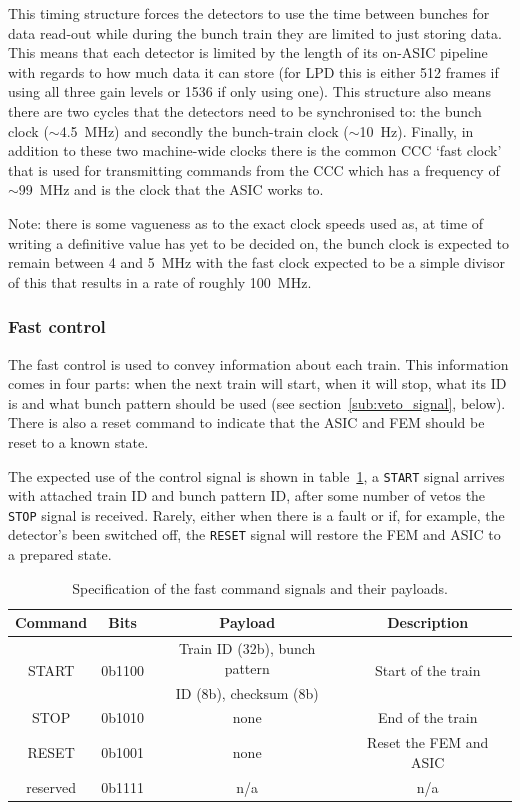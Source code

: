This timing structure forces the detectors to use the time between bunches for data read-out while during the bunch train they are limited to just storing data. This means that each detector is limited by the length of its on-ASIC pipeline with regards to how much data it can store (for LPD this is either 512 frames if using all three gain levels or 1536 if only using one). This structure also means there are two cycles that the detectors need to be synchronised to: the bunch clock (\(\sim\)4.5~MHz) and secondly the bunch-train clock (\(\sim\)10~Hz). Finally, in addition to these two machine-wide clocks there is the common CCC `fast clock' that is used for transmitting commands from the CCC which has a frequency of \(\sim\)99~MHz and is the clock that the ASIC works to.

Note: there is some vagueness as to the exact clock speeds used as, at time of writing a definitive value has yet to be decided on, the bunch clock is expected to remain between 4 and 5~MHz with the fast clock expected to be a simple divisor of this that results in a rate of roughly 100~MHz. 
\subsubsection{Fast control} %
\label{sub:control_signal}
The fast control is used to convey information about each train. This information comes in four parts: when the next train will start, when it will stop, what its ID is and what bunch pattern should be used (see section~\ref{sub:veto_signal}, below). There is also a reset command to indicate that the ASIC and FEM should be reset to a known state. 

The expected use of the control signal is shown in table~\ref{tab:fast_commands}, a \texttt{START} signal arrives with attached train ID and bunch pattern ID, after some number of vetos the \texttt{STOP} signal is received. Rarely, either when there is a fault or if, for example, the detector's been switched off, the \texttt{RESET} signal will restore the FEM and ASIC to a prepared state.
\begin{table}[htbp]
  \begin{center}
  \begin{tabular}{c | c | c | c}
    Command  & Bits   & Payload & Description \\
    \hline   
    \multirow{2}{*}{START}    
             & \multirow{2}{*}{0b1100}
                      & Train ID (32b), bunch pattern  & \multirow{2}{*}{Start of the train} \\
             &        & ID (8b), checksum (8b)         & \\
    STOP     & 0b1010 & none                           & End of the train \\
    RESET    & 0b1001 & none                           & Reset the FEM and ASIC \\
    reserved & 0b1111 & n/a                            & n/a\\
  \end{tabular}
  \end{center}
  \caption{Specification of the fast command signals and their payloads.}
  \label{tab:fast_commands}
\end{table}
